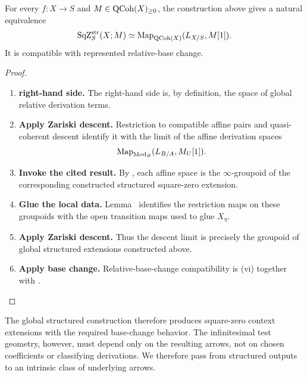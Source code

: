 \begin{theorem}
\label{thm:global-square-zero-classification}
For every \(f:X\to S\) and \(M\in\operatorname{QCoh}(X)_{\geq0}\), the construction above
gives a natural equivalence
\[
    \operatorname{SqZ}^{\mathrm{str}}_S(X;M)
    \simeq
    \operatorname{Map}_{\operatorname{QCoh}(X)}(L_{X/S},M[1]).
\]
It is compatible with represented relative-base change.
\end{theorem}

\begin{proof}
\leavevmode
\begin{enumerate}[label=\textup{(\arabic*)}]
    \item \textbf{right-hand side.}
    The right-hand side is, by definition, the space of global relative derivation terms.

    \item \textbf{Apply Zariski descent.}
    Restriction to compatible affine pairs and quasi-coherent descent identify it with the limit
    of the affine derivation spaces
    \[
        \operatorname{Map}_{\operatorname{Mod}_B}(L_{B/A},M_U[1]).
    \]

    \item \textbf{Invoke the cited result.}
    By , each affine space is the
    \(\infty\)-groupoid of the corresponding constructed structured square-zero extension.

    \item \textbf{Glue the local data.}
    Lemma~ identifies the restriction maps on
    these groupoids with the open transition maps used to glue \(X_\eta\).

    \item \textbf{Apply Zariski descent.}
    Thus the descent limit is precisely the groupoid of global structured extensions constructed
    above.

    \item \textbf{Apply base change.}
    Relative-base-change compatibility is
    \textup{(vi)} together with
    .
\end{enumerate}
\end{proof}
The global structured construction therefore produces square-zero context
extensions with the required base-change behavior. The infinitesimal test
geometry, however, must depend only on the resulting arrows, not on chosen
coefficients or classifying derivations. We therefore pass from structured
outputs to an intrinsic class of underlying arrows.

